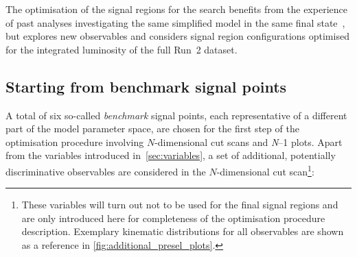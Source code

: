 The optimisation of the signal regions for the \onelepton search benefits from the experience of past analyses investigating the same simplified model in the same final state~\cite{SUSY-2013-23,SUSY-2017-01}, but explores new observables and considers signal region configurations optimised for the integrated luminosity of the full Run~2 dataset. 

\subsection{Starting from benchmark signal points}

A total of six so-called \textit{benchmark} signal points, each representative of a different part of the model parameter space, are chosen for the first step of the optimisation procedure involving $N$-dimensional cut scans and \textit{N}--1 plots.
Apart from the variables introduced in~\cref{sec:variables}, a set of additional, potentially discriminative observables are considered in the $N$-dimensional cut scan\footnote{These variables will turn out not to be used for the final signal regions and are only introduced here for completeness of the optimisation procedure description. Exemplary kinematic distributions for all observables are shown as a reference in \cref{fig:additional_presel_plots}.}:
